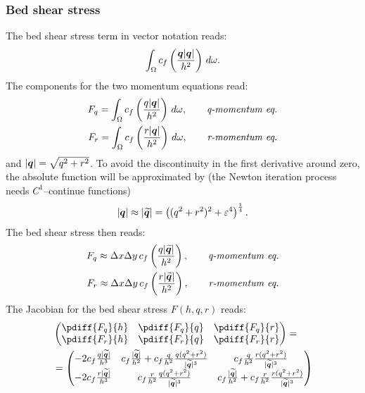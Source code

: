 \subsubsection{Bed shear stress}
The bed shear stress  term in vector notation reads:
\begin{align}
    \int_\Omega c_f \left( \frac{\bm{q}\lvert \bm{q} \rvert}{h^2} \right)\, d\omega.
\end{align}
The components for the two momentum equations read:
\begin{align}
    F_q = \int_\Omega c_f \left( \frac{q\lvert \bm{q} \rvert}{h^2} \right)\, d\omega, \qquad \textit{q-momentum eq.}
    \\
    F_r = \int_\Omega c_f \left( \frac{r\lvert \bm{q} \rvert}{h^2} \right)\, d\omega, \qquad \textit{r-momentum eq.}
\end{align}
and $\lvert \bm{q} \rvert = \sqrt{q^2 + r^2}$.
To avoid the discontinuity in the first derivative around zero, the absolute function will be approximated by (the Newton iteration process needs $C^1$--continue functions)
\begin{align}
    \lvert \bm{q} \rvert \approx \lvert \widetilde{\bm{q}} \rvert = \left( (q^2 + r^2)^2 + \varepsilon^4 \right)^{\frac{1}{4}}.
\end{align}
The bed shear stress then reads:
\begin{align}
    F_q \approx \Delta x\Delta y\, c_f \left( \frac{q\lvert \widetilde{\bm{q}} \rvert}{h^2} \right), \qquad \textit{q-momentum eq.}
    \\
    F_r \approx \Delta x\Delta y\, c_f \left( \frac{r\lvert \widetilde{\bm{q}} \rvert}{h^2} \right), \qquad \textit{r-momentum eq.}
\end{align}
The Jacobian for the bed shear stress $F(h,q,r)$ reads:
\begin{align}
    &\begin{pmatrix}
        \pdiff{F_q}{h} & \pdiff{F_q}{q} & \pdiff{F_q}{r}
        \\
        \pdiff{F_r}{h} & \pdiff{F_r}{q} & \pdiff{F_r}{r}
    \end{pmatrix}
    =
    \\
    &=
    \begin{pmatrix}
       -2c_f \frac{q\abs{\widetilde{\vec{q}}}}{h^3}
       & c_f\frac{\abs{\widetilde{\vec{q}}}}{h^2}
       + c_f \frac{q}{h^2} \frac{q(q^2+ r^2)}{\abs{\widetilde{\vec{q}}}^3}
       & c_f \frac{q}{h^2}\frac{r(q^2+ r^2)}{\abs{\widetilde{\vec{q}}}^3}
       \\
       -2c_f \frac{r\abs{\widetilde{\vec{q}}}}{h^3}
       & c_f \frac{r}{h^2}\frac{q(q^2+ r^2)}{\abs{\widetilde{\vec{q}}}^3}
       & c_f\frac{\abs{\widetilde{\vec{q}}}}{h^2}
       + c_f \frac{r}{h^2}\frac{r(q^2+ r^2)}{\abs{\widetilde{\vec{q}}}^3}
    \end{pmatrix}
\end{align}

